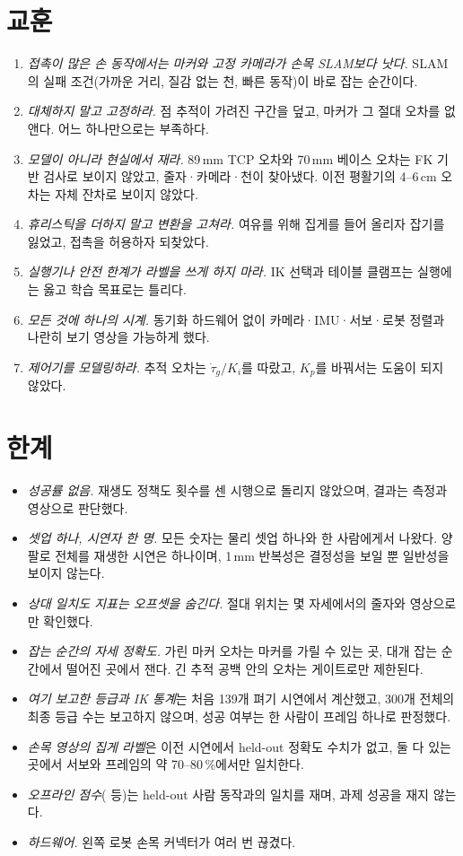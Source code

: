 \documentclass[conference,10pt]{IEEEtran}
\newcommand{\mm}{\,mm\xspace}
\begin{document}
\section{교훈}\label{sec:lessons}
\begin{enumerate}
\item \emph{접촉이 많은 손 동작에서는 마커와 고정 카메라가 손목 SLAM보다 낫다.} SLAM의 실패 조건(가까운 거리, 질감 없는 천, 빠른
  동작)이 바로 잡는 순간이다.
\item \emph{대체하지 말고 고정하라.} 점 추적이 가려진 구간을 덮고, 마커가 그 절대 오차를 없앤다. 어느 하나만으로는 부족하다.
\item \emph{모델이 아니라 현실에서 재라.} 89\mm TCP 오차와 70\mm 베이스 오차는 FK 기반 검사로 보이지 않았고, 줄자·카메라·천이 찾아냈다.
  이전 평활기의 4--6\,cm 오차는 자체 잔차로 보이지 않았다.
\item \emph{휴리스틱을 더하지 말고 변환을 고쳐라.} 여유를 위해 집게를 들어 올리자 잡기를 잃었고, 접촉을 허용하자 되찾았다.
\item \emph{실행기나 안전 한계가 라벨을 쓰게 하지 마라.} IK 선택과 테이블 클램프는 실행에는 옳고 학습 목표로는 틀리다.
\item \emph{모든 것에 하나의 시계.} 동기화 하드웨어 없이 카메라·IMU·서보·로봇 정렬과 나란히 보기 영상을 가능하게 했다.
\item \emph{제어기를 모델링하라.} 추적 오차는 $\dot\tau_g/K_i$를 따랐고, $K_p$를 바꿔서는 도움이 되지 않았다.
\end{enumerate}

\section{한계}\label{sec:limits}
\begin{itemize}
\item \emph{성공률 없음.} 재생도 정책도 횟수를 센 시행으로 돌리지 않았으며, 결과는 측정과 영상으로 판단했다.
\item \emph{셋업 하나, 시연자 한 명.} 모든 숫자는 물리 셋업 하나와 한 사람에게서 나왔다. 양팔로 전체를 재생한 시연은 하나이며,
  1\mm 반복성은 결정성을 보일 뿐 일반성을 보이지 않는다.
\item \emph{상대 일치도 지표는 오프셋을 숨긴다.} 절대 위치는 몇 자세에서의 줄자와 영상으로만 확인했다.
\item \emph{잡는 순간의 자세 정확도.} 가린 마커 오차는 마커를 가릴 수 있는 곳, 대개 잡는 순간에서 떨어진 곳에서 잰다. 긴 추적 공백
  안의 오차는 게이트로만 제한된다.
\item \emph{여기 보고한 등급과 IK 통계}는 처음 139개 펴기 시연에서 계산했고, 300개 전체의 최종 등급 수는 보고하지 않으며, 성공 여부는 한 사람이 프레임 하나로 판정했다.
\item \emph{손목 영상의 집게 라벨}은 이전 시연에서 held-out 정확도 수치가 없고, 둘 다 있는 곳에서 서보와 프레임의 약 70--80\,\%에서만
  일치한다.
\item \emph{오프라인 점수}( 등)는 held-out 사람 동작과의 일치를 재며, 과제 성공을 재지 않는다.
\item \emph{하드웨어.} 왼쪽 로봇 손목 커넥터가 여러 번 끊겼다.
\end{itemize}
\end{document}
